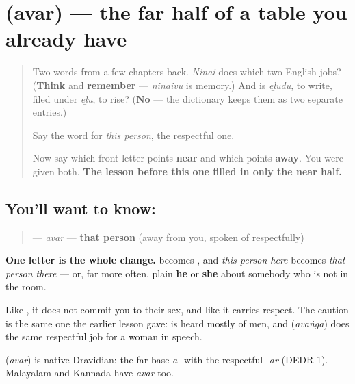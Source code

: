 \section[\texorpdfstring{\ta{அவர்} (avar)}{அவர் (avar)}]{ (avar) — the far half of a table you already have}

\label{lesson:TA-C37-avar}



\begin{quote}
Two words from a few chapters back. \emph{Ninai} does which two English jobs? (\textbf{Think} and \textbf{remember} — \emph{ninaivu} is memory.) And is \emph{eḻudu}, to write, filed under \emph{eḻu}, to rise? (\textbf{No} — the dictionary keeps them as two separate entries.)

Say the word for \emph{this person}, the respectful one.

Now say which front letter points \textbf{near} and which points \textbf{away}. You were given both. \textbf{The lesson before this one filled in only the near half.}
\end{quote}

\subsection*{You'll want to know: }
\begin{quote}
\textbf{} — \emph{avar} — \textbf{that person} (away from you, spoken of respectfully)
\end{quote}

\textbf{One letter is the whole change.}  becomes , and \emph{this person here} becomes \emph{that person there} — or, far more often, plain \textbf{he} or \textbf{she} about somebody who is not in the room.

Like , it does not commit you to their sex, and like  it carries respect. The caution is the same one the earlier lesson gave: \textbf{} is heard mostly of men, and \textbf{} (\emph{avaṅga}) does the same respectful job for a woman in speech.

\begin{cousinweb}
\textbf{} (\emph{avar}) is native Dravidian: the far base \emph{a-} with the respectful \emph{-ar} (DEDR 1). Malayalam and Kannada have \emph{avar} too.
\end{cousinweb}

